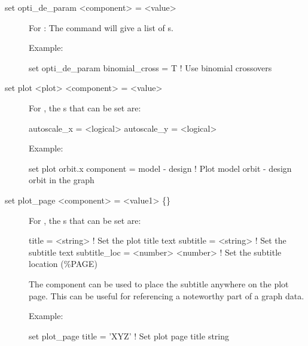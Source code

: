{{\begin{description}
\item[set opti_de_param <component> = <value>] \Newline

\vskip -0.2in

For : The  command will give a list of 
s.

Example:
\begin{example}
  set opti_de_param binomial_cross = T  ! Use binomial crossovers 
\end{example}


\item[set plot <plot> <component> = <value>] \Newline

\vskip -0.2in

For , the s that can be set are:
\begin{example}
  autoscale_x = <logical>
  autoscale_y = <logical>
\end{example}

Example:
\begin{example}
  set plot orbit.x component = model - design  
                          ! Plot model orbit - design orbit in the graph
\end{example}


\item[set plot\_page <component> = <value1> \{<value2>\}] \Newline

\vskip -0.2in

For , the s that can be set are:
\begin{example}
  title        = <string>          ! Set the plot title text
  subtitle     = <string>          ! Set the subtitle text
  subtitle_loc = <number> <number> ! Set the subtitle location (\%PAGE)
\end{example}
The  component can be used to place the subtitle anywhere on
the plot page. This can be useful for referencing a noteworthy part of a graph
data.

Example:
\begin{example}
  set plot_page title = 'XYZ'  ! Set plot page title string
\end{example}



\end{description}}}
